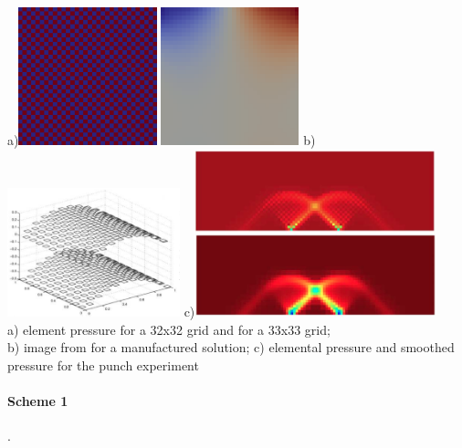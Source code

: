 \begin{center}
a)\includegraphics[width=4cm]{images/checkerboard/p_el}
\includegraphics[width=4cm]{images/checkerboard/p_el_33x33}
b)\includegraphics[width=5cm]{images/checkerboard/press_doneahuerta}
c)\includegraphics[width=7cm]{images/checkerboard/douarpunch}\\
{\captionfont a) element pressure for a 32x32 grid and for a 33x33 grid;\\ 
b) image from \cite[p307]{dohu03} for a manufactured solution;
c) elemental pressure and smoothed pressure for the punch experiment \cite{thfb08}}
\end{center}

\paragraph{Scheme 1}.

